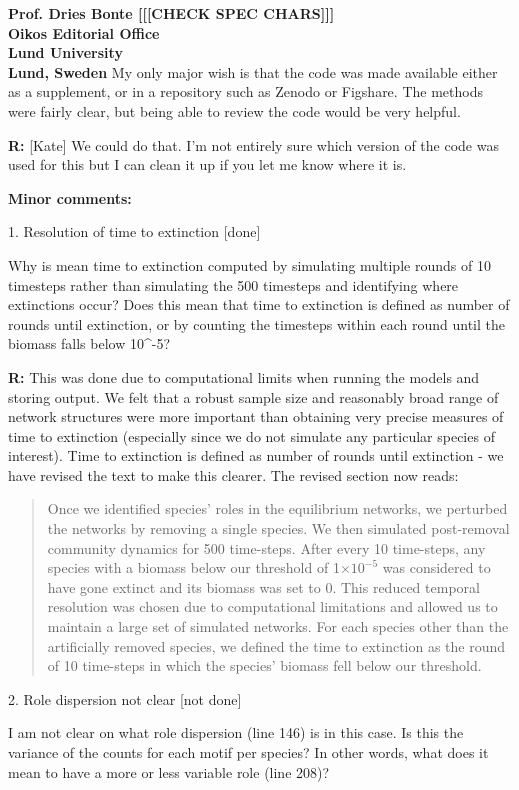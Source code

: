\documentclass[12pt]{letter}
\begin{document}
\begin{letter}{\bf Prof. Dries Bonte [[[CHECK SPEC CHARS]]]\\
Oikos Editorial Office \\
Lund University \\
Lund, Sweden}
  My only major wish is that the code was made available either as a supplement, or in a repository such as Zenodo or Figshare. The methods were fairly clear, but being able to review the code would be very helpful.


  \textbf{R:}  [Kate]
  We could do that. I'm not entirely sure which version of the code was used for this but I can clean it up if you let me know where it is.


  \textbf{Minor comments:}

  1. Resolution of time to extinction [done]


    Why is mean time to extinction computed by simulating multiple rounds of 10 timesteps rather than simulating the 500 timesteps and identifying where extinctions occur? Does this mean that time to extinction is defined as number of rounds until extinction, or by counting the timesteps within each round until the biomass falls below 10^-5? 

    \textbf{R:} This was done due to computational limits when running the models and storing output. We felt that a robust sample size and reasonably broad range of network structures were more important than obtaining very precise measures of time to extinction (especially since we do not simulate any particular species of interest). Time to extinction is defined as number of rounds until extinction - we have revised the text to make this clearer. The revised section now reads:

    \begin{quotation}

            Once we identified species' roles in the equilibrium networks, we perturbed the networks by removing a single species. 
            We then simulated post-removal community dynamics for 500 time-steps.
            After every 10 time-steps, any species with a biomass below our threshold of 1$\times10^{-5}$ was considered to have gone extinct and its biomass was set to 0.
            This reduced temporal resolution was chosen due to computational limitations and allowed us to maintain a large set of simulated networks.
            For each species other than the artificially removed species, we defined the time to extinction as the round of 10 time-steps in which the species' biomass fell below our threshold. 

    \end{quotation}


  2. Role dispersion not clear [not done]


    I am not clear on what role dispersion (line 146) is in this case. Is this the variance of the counts for each motif per species? In other words, what does it mean to have a more or less variable role (line 208)?


\end{letter}
\end{document}
